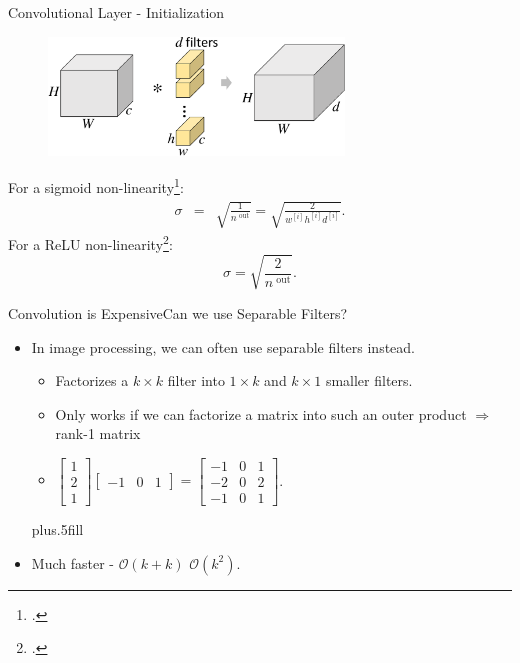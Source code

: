 \documentclass[t,xcolor=dvipsnames]{beamer}
\begin{document}
\begin{frame}{Convolutional Layer - Initialization}
\begin{figure}
\includegraphics[width=0.7\textwidth, page=1]{../Figs/PDF/sparsification}
\end{figure}
For a sigmoid non-linearity\footcite{glorot2010understanding}:
\begin{eqnarray*}
\sigma &=& \sqrt{\frac{1}{n^{\textrm{ out}}}} = \sqrt{\frac{2}{w^{[i]} h^{[i]} d^{[i]}}}.
\end{eqnarray*}
For a ReLU non-linearity\footcite{He2015}:
\begin{equation*}
\sigma = \sqrt{\frac{2}{n^{\textrm{ out}}}}.
\end{equation*}
\end{frame}


\begin{frame}{Convolution is Expensive}{Can we use Separable Filters?}
\begin{itemize}
    \item In image processing, we can often use separable filters instead.
    \begin{itemize}
        \item Factorizes a $k\times k$ filter into $1\times k$ and $k \times 1$ smaller filters.
        \item Only works if we can factorize a matrix into such an outer product $\Rightarrow$ rank-1 matrix    \item \eg $\begin{bmatrix} 1 \\ 2 \\ 1\end{bmatrix} \begin{bmatrix} -1 & 0 & 1\end{bmatrix}  = \begin{bmatrix} -1 & 0 & 1 \\ -2 & 0 & 2 \\ -1 & 0 & 1\end{bmatrix}$.
    \end{itemize}
    
    \vskip0pt plus.5fill
    \item Much faster - $\mathcal{O}(k+k)$ \vs $\mathcal{O}(k^2)$.
\end{itemize}
\end{frame}
\end{document}
